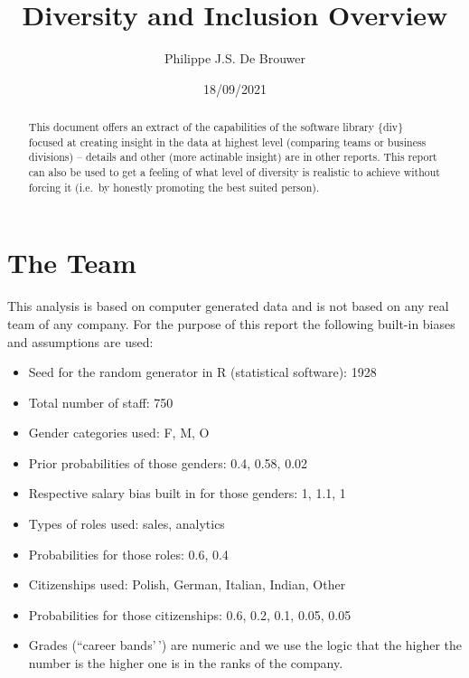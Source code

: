 \documentclass[
]{article}
\title{Diversity and Inclusion Overview}
\author{Philippe J.S. De Brouwer}
\date{18/09/2021}
\providecommand{\tightlist}{%
  \setlength{\itemsep}{0pt}\setlength{\parskip}{0pt}}
\begin{document}
\maketitle
\begin{abstract}
This document offers an extract of the capabilities of the software
library \{div\} focused at creating insight in the data at highest level
(comparing teams or business divisions) -- details and other (more
actinable insight) are in other reports. This report can also be used to
get a feeling of what level of diversity is realistic to achieve without
forcing it (i.e.~by honestly promoting the best suited person).
\end{abstract}

{
\setcounter{tocdepth}{2}
\tableofcontents
}
\hypertarget{the-team}{%
\section{The Team}\label{the-team}}

This analysis is based on computer generated data and is not based on
any real team of any company. For the purpose of this report the
following built-in biases and assumptions are used:

\begin{itemize}
\tightlist
\item
  Seed for the random generator in R (statistical software): 1928
\item
  Total number of staff: 750
\item
  Gender categories used: F, M, O
\item
  Prior probabilities of those genders: 0.4, 0.58, 0.02
\item
  Respective salary bias built in for those genders: 1, 1.1, 1
\item
  Types of roles used: sales, analytics
\item
  Probabilities for those roles: 0.6, 0.4
\item
  Citizenships used: Polish, German, Italian, Indian, Other
\item
  Probabilities for those citizenships: 0.6, 0.2, 0.1, 0.05, 0.05
\item
  Grades (``career bands'\,') are numeric and we use the logic that the
  higher the number is the higher one is in the ranks of the company.
\end{itemize}
\end{document}

